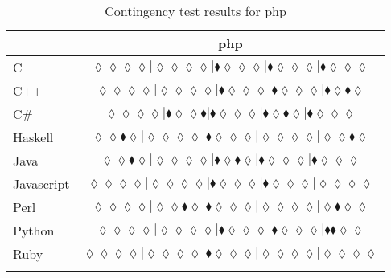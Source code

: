 \begin{table*}
\centering
\begin{tabular}{l c}
& {\sc php} \\
\hline

C & $\scriptscriptstyle\lozenge\lozenge\lozenge\lozenge|\lozenge\lozenge\lozenge\lozenge|\blacklozenge\lozenge\lozenge\lozenge|\blacklozenge\lozenge\lozenge\lozenge|\blacklozenge\lozenge\lozenge\lozenge$ \\
C++ & $\scriptscriptstyle\lozenge\lozenge\lozenge\lozenge|\lozenge\lozenge\lozenge\lozenge|\blacklozenge\lozenge\lozenge\lozenge|\blacklozenge\lozenge\lozenge\lozenge|\blacklozenge\lozenge\blacklozenge\lozenge$ \\
C\# & $\scriptscriptstyle\lozenge\lozenge\lozenge\lozenge|\blacklozenge\lozenge\lozenge\blacklozenge|\blacklozenge\lozenge\lozenge\lozenge|\blacklozenge\lozenge\blacklozenge\lozenge|\blacklozenge\lozenge\lozenge\lozenge$ \\
Haskell & $\scriptscriptstyle\lozenge\lozenge\blacklozenge\lozenge|\lozenge\lozenge\lozenge\lozenge|\blacklozenge\lozenge\lozenge\lozenge|\lozenge\lozenge\lozenge\lozenge|\lozenge\lozenge\blacklozenge\lozenge$ \\
Java & $\scriptscriptstyle\lozenge\lozenge\blacklozenge\lozenge|\lozenge\lozenge\lozenge\lozenge|\blacklozenge\lozenge\blacklozenge\lozenge|\blacklozenge\lozenge\lozenge\lozenge|\blacklozenge\lozenge\lozenge\lozenge$ \\
Javascript & $\scriptscriptstyle\lozenge\lozenge\lozenge\lozenge|\lozenge\lozenge\lozenge\lozenge|\blacklozenge\lozenge\lozenge\lozenge|\blacklozenge\lozenge\lozenge\lozenge|\lozenge\lozenge\lozenge\lozenge$ \\
Perl & $\scriptscriptstyle\lozenge\lozenge\lozenge\lozenge|\lozenge\lozenge\blacklozenge\lozenge|\blacklozenge\lozenge\lozenge\lozenge|\lozenge\lozenge\lozenge\lozenge|\lozenge\blacklozenge\lozenge\lozenge$ \\
Python & $\scriptscriptstyle\lozenge\lozenge\lozenge\lozenge|\lozenge\lozenge\lozenge\lozenge|\blacklozenge\lozenge\lozenge\lozenge|\blacklozenge\lozenge\lozenge\lozenge|\blacklozenge\blacklozenge\lozenge\lozenge$ \\
Ruby & $\scriptscriptstyle\lozenge\lozenge\lozenge\lozenge|\lozenge\lozenge\lozenge\lozenge|\blacklozenge\lozenge\lozenge\lozenge|\lozenge\lozenge\lozenge\lozenge|\lozenge\lozenge\lozenge\lozenge$ \\

\hline
& \\
\end{tabular}
\caption{Contingency test results for php}
\label{tbl:contingency-test-results-php}
\end{table*}


